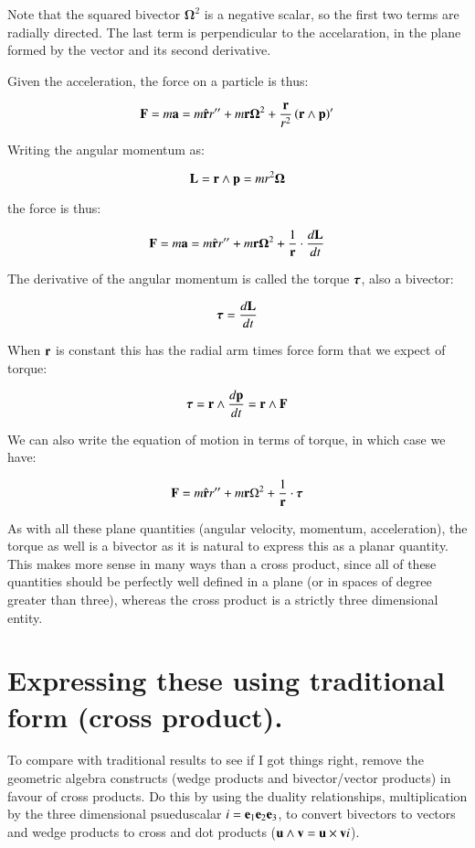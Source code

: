 \documentclass{article}      %
\newcommand{\BOmega}[0]{\boldsymbol{\Omega}}
\begin{document}
Note that the squared bivector $\BOmega^2$ is a negative scalar, so the first two terms are radially directed.
The last term is perpendicular to the accelaration, in the plane formed by the vector and its second derivative.

Given the acceleration, the force on a particle is thus:

\[
\BF = m\Ba = m\rcap r'' + m \Br \BOmega^2 + \frac{\Br}{r^2} \left(\Br \wedge \Bp\right)'
\]

Writing the angular momentum as:

\[
\BL = \Br \wedge \Bp = m r^2 \BOmega
\]

the force is thus:

\[
\BF = m\Ba = m\rcap r'' + m \Br \BOmega^2 + \frac{1}{\Br} \cdot \frac{d\BL}{dt}
\]

The derivative of the angular momentum is called the torque $\boldsymbol{\tau}$, also a bivector:

\[
\boldsymbol{\tau} = \frac{d\mathbf{L}}{dt}
\]


When $\mathbf{r}$ is constant this has the radial arm times force form that we expect of torque:

\[
\boldsymbol{\tau} = \mathbf{r} \wedge \frac{d \mathbf{p}}{dt} = \mathbf{r} \wedge \mathbf{F}
\]

%
We can also write the equation of motion in terms of torque, in which case we have:

\[
\mathbf{F} = m\hat{\mathbf{r}} r'' + m \mathbf{r} \Omega^2 + \frac{1}{\mathbf{r}} \cdot \boldsymbol{\tau}
\]

As with all these plane quantities (angular velocity, momentum, acceleration), the torque as well is a bivector as it is natural to express this as a planar quantity.  This makes
more sense in many ways than a cross product, since all of these quantities should be perfectly well defined in a plane (or in spaces of degree greater than three), whereas the
cross product is a strictly three dimensional entity.

\section{ Expressing these using traditional form (cross product). }

To compare with traditional results to see if I got things right, remove the geometric algebra constructs
(wedge products and bivector/vector products) in favour of cross products.  Do this by 
using the duality relationships, multiplication by the three dimensional psueduscalar
$i = \mathbf{e}_1\mathbf{e}_2\mathbf{e}_3$, to convert bivectors to vectors and wedge products to cross and dot products
($\mathbf{u} \wedge \mathbf{v} = \mathbf{u} \times \mathbf{v} i$).
\end{document}
